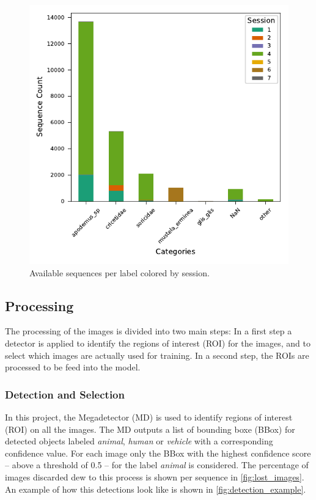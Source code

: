     \begin{figure}[ht]
    \centering
    \includegraphics{figures/label2_session.pdf}
    \caption{Available sequences per label colored by session.}
    \label{fig:sequenceperlabel}
    \end{figure}

    \subsection{Processing}

    The processing of the images is divided into two main steps: 
    In a first step a detector is applied to identify the regions of interest (ROI) for the images, and to select which images are actually used for training.
    In a second step, the ROIs are processed to be feed into the model.

        \subsubsection{Detection and Selection}
        
        In this project, the Megadetector (MD) \autocite{morrisEfficientPipelineCamera2025} is used to identify regions of interest (ROI) on all the images.
        The MD outputs a list of bounding boxe (BBox) for detected objects labeled \textit{animal}, \textit{human} or \textit{vehicle} with a corresponding confidence value.
        For each image only the BBox with the highest confidence score -- above a threshold of 0.5 -- for the label \textit{animal} is considered.
        The percentage of images discarded dew to this process is  shown per sequence in \autoref{fig:lost_images}.
        An example of how this detections look like is shown in \autoref{fig:detection_example}.

